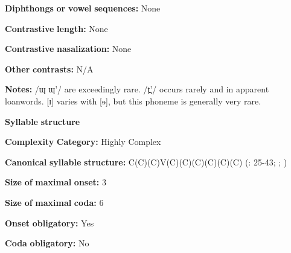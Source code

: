 \documentclass[output=paper]{langsci/langscibook}
\begin{document}
\begin{styleBody}
\textbf{Diphthongs} \textbf{or} \textbf{vowel} \textbf{sequences:} None
\end{styleBody}

\begin{styleBody}
\textbf{Contrastive} \textbf{length:} None
\end{styleBody}

\begin{styleBody}
\textbf{Contrastive} \textbf{nasalization:} None
\end{styleBody}

\begin{styleBody}
\textbf{Other} \textbf{contrasts:} N/A
\end{styleBody}

\begin{styleBody}
\textbf{Notes:} /ɰ ɰ’/ are exceedingly rare. /t̪’/ occurs rarely and in apparent loanwords. [ɪ] varies with [ɘ], but this phoneme is generally very rare.
\end{styleBody}

\begin{styleBody}
\textbf{Syllable} \textbf{structure}
\end{styleBody}

\begin{styleBody}
\textbf{Complexity} \textbf{Category:} Highly Complex
\end{styleBody}

\begin{styleBody}
\textbf{Canonical} \textbf{syllable} \textbf{structure:} C(C)(C)V(C)(C)(C)(C)(C)(C) (\citealt{ThompsonThompson1992}: 25-43; \citealt{ThompsonThompson1996}; \citealt{ThompsonEtAl1996})
\end{styleBody}

\begin{styleBody}
\textbf{Size} \textbf{of} \textbf{maximal} \textbf{onset:} 3
\end{styleBody}

\begin{styleBody}
\textbf{Size} \textbf{of} \textbf{maximal} \textbf{coda:} 6
\end{styleBody}

\begin{styleBody}
\textbf{Onset} \textbf{obligatory:} Yes
\end{styleBody}

\begin{styleBody}
\textbf{Coda} \textbf{obligatory:} No
\end{styleBody}
\end{document}
